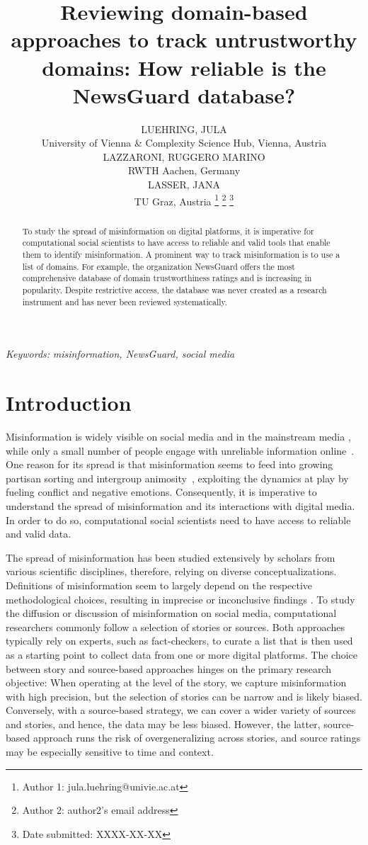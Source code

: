 \documentclass[12pt,twoside]{article}
\date{}
\title{ \normalsize \textbf{} \vspace{-1.5em} Reviewing domain-based approaches to track untrustworthy domains: How reliable is the NewsGuard database?}
\author{\normalsize LUEHRING, JULA \\ \normalsize University of Vienna \& Complexity Science Hub, Vienna, Austria 
\vspace{1em} \\ \normalsize LAZZARONI, RUGGERO MARINO \\ \normalsize RWTH Aachen, Germany \vspace{1em} \\ \normalsize LASSER, JANA \\ \normalsize TU Graz, Austria \thanks{\hspace{-1em} Author 1: jula.luehring@univie.ac.at} \thanks{\hspace{-1em} Author 2: author2's email address} \thanks{\hspace{-1em} Date submitted: XXXX-XX-XX}}
\providecommand{\keywords}[1]
{
   \small	
  \textit{\hspace{-1em} Keywords: } #1
}
\begin{document}
\maketitle
\thispagestyle{firstpage}
\vspace{-8em}
\begin{abstract}
\noindent To study the spread of misinformation on digital platforms, it is imperative for computational social scientists to have access to reliable and valid tools that enable them to identify misinformation. A prominent way to track misinformation is to use a list of domains. For example, the organization NewsGuard offers the most comprehensive database of domain trustworthiness ratings and is increasing in popularity. Despite restrictive access, the database was never created as a research instrument and has never been reviewed systematically.
\end{abstract}
\keywords{\textit{misinformation, NewsGuard, social media} \vspace{8ex}}

\section{Introduction}
Misinformation is widely visible on social media \citep{lazerScienceFakeNews2018} and in the mainstream media \citep{tsfatiCausesConsequencesMainstream2020}, while only a small number of people engage with unreliable information online~\citep{allenEvaluatingFakeNews2020, grinbergFakeNewsTwitter2019}. One reason for its spread is that misinformation seems to feed into growing partisan sorting and intergroup animosity~\citep{gonzalez-bailonAsymmetricIdeologicalSegregation2023a, robertsonUsersChooseEngage2023a}, exploiting the dynamics at play by fueling conflict and negative emotions. Consequently, it is imperative to understand the spread of misinformation and its interactions with digital media. In order to do so, computational social scientists need to have access to reliable and valid data. 

The spread of misinformation has been studied extensively by scholars from various scientific disciplines, therefore, relying on diverse conceptualizations. Definitions of misinformation seem to largely depend on the respective methodological choices, resulting in imprecise or inconclusive findings \citep{altayMisinformationMisinformationConceptual2023a}. To study the diffusion or discussion of misinformation on social media, computational researchers commonly follow a selection of stories or sources. Both approaches typically rely on experts, such as fact-checkers, to curate a list that is then used as a starting point to collect data from one or more digital platforms. The choice between story and source-based approaches hinges on the primary research objective: When operating at the level of the story, we capture misinformation with high precision, but the selection of stories can be narrow and is likely biased. Conversely, with a source-based strategy, we can cover a wider variety of sources and stories, and hence, the data may be less biased. However, the latter, source-based approach runs the risk of overgeneralizing across stories, and source ratings may be especially sensitive to time and context. 
\end{document}
